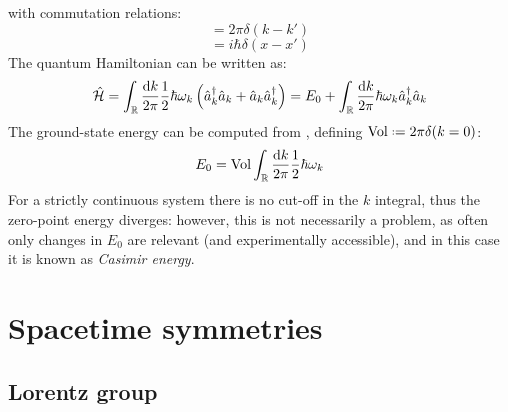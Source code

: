 with commutation relations:
\begin{equation}
  [\hat{a}_k, \hat{a}_{k'}^\dagger] = 2\pi \delta(k - k')
\end{equation}
\begin{equation}
  [\hat\phi(x,t), \hat\Pi(x',t)] = i\hbar \delta(x - x')
\end{equation}
The quantum Hamiltonian can be written as:
\begin{equation}
  \hat{\mathcal{H}} = \int_{\mathbb{R}} \frac{\mathrm{d} k}{2\pi} \frac{1}{2} \hbar \omega_k \left( \hat{a}_k^\dagger \hat{a}_k + \hat{a}_k \hat{a}_k^\dagger \right) = E_0 + \int_{\mathbb{R}} \frac{\mathrm{d} k}{2\pi} \hbar \omega_k \hat{a}_k^\dagger \hat{a}_k
\end{equation}
The ground-state energy can be computed from , defining $ \mathrm{Vol} \defeq 2\pi \delta(k = 0) $:
\begin{equation}
  E_0 = \mathrm{Vol} \int_{\mathbb{R}} \frac{\mathrm{d} k}{2\pi} \frac{1}{2} \hbar \omega_k
\end{equation}
For a strictly continuous system there is no cut-off in the $ k $ integral, thus the zero-point energy diverges: however, this is not necessarily a problem, as often only changes in $ E_0 $ are relevant (and experimentally accessible), and in this case it is known as \textit{Casimir energy}.

\newpage

\section{Spacetime symmetries}

\subsection{Lorentz group}

